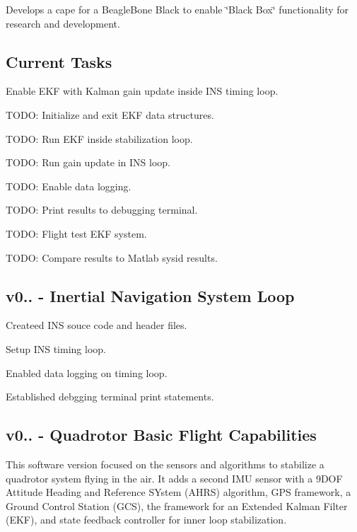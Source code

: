 Develops a cape for a Beagle\+Bone Black to enable \char`\"{}\+Black 
\+Box\char`\"{} functionality for research and development.

\subsection*{Current Tasks }

Enable E\+KF with Kalman gain update inside I\+NS timing loop. 
\begin{DoxyItemize}
\item T\+O\+DO\+: Initialize and exit E\+KF data structures.  
\item T\+O\+DO\+: Run E\+KF inside stabilization loop.  
\item T\+O\+DO\+: Run gain update in I\+NS loop.  
\item T\+O\+DO\+: Enable data logging.  
\item T\+O\+DO\+: Print results to debugging terminal.  
\item T\+O\+DO\+: Flight test E\+KF system.  
\item T\+O\+DO\+: Compare results to Matlab sysid results.  
\end{DoxyItemize}

\subsection*{v0.. -\/ Inertial Navigation System Loop }


\begin{DoxyItemize}
\item Createed I\+NS souce code and header files.  
\item Setup I\+NS timing loop.  
\item Enabled data logging on timing loop.  
\item Established debgging terminal print statements.  
\end{DoxyItemize}

\subsection*{v0.. -\/ Quadrotor Basic Flight Capabilities }

This software version focused on the sensors and algorithms to stabilize a quadrotor system flying in the air. It adds a second I\+MU sensor with a 9\+D\+OF Attitude Heading and Reference S\+Ystem (A\+H\+RS) algorithm, G\+PS framework, a Ground Control Station (G\+CS), the framework for an Extended Kalman Filter (E\+KF), and state feedback controller for inner loop stabilization.


